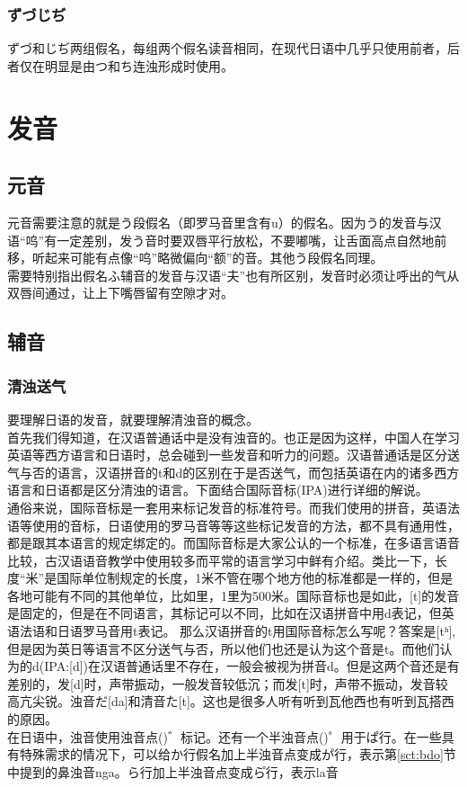 \documentclass[12pt, a4paper, oneside]{book}
\newcommand{\jp}{\CJKfamily{zj}}
\begin{document}
\subsection{ずづじぢ}
ずづ和じぢ两组假名，每组两个假名读音相同，在现代日语中几乎只使用前者，后者仅在明显是由つ和ち连浊形成时使用。

\chapter{发音}\label{chap:prn}
\section{元音}
元音需要注意的就是う段假名（即罗马音里含有u）的假名。因为う的发音与汉语“呜”有一定差别，发う音时要双唇平行放松，不要嘟嘴，让舌面高点自然地前移，听起来可能有点像“呜”略微偏向“额”的音。其他う段假名同理。\\
需要特别指出假名ふ辅音的发音与汉语“夫”也有所区别，发音时必须让呼出的气从双唇间通过，让上下嘴唇留有空隙才对。
\section{辅音}
\subsection{清浊送气}
要理解日语的发音，就要理解清浊音的概念。\\首先我们得知道，在汉语普通话中是没有浊音的。也正是因为这样，中国人在学习英语等西方语言和日语时，总会碰到一些发音和听力的问题。汉语普通话是区分送气与否的语言，汉语拼音的t和d的区别在于是否送气，而包括英语在内的诸多西方语言和日语都是区分清浊的语言。下面结合国际音标(IPA)进行详细的解说。
\\通俗来说，国际音标是一套用来标记发音的标准符号。而我们使用的拼音，英语法语等使用的音标，日语使用的罗马音等等这些标记发音的方法，都不具有通用性，都是跟其本语言的规定绑定的。而国际音标是大家公认的一个标准，在多语言语音比较，古汉语语音教学中使用较多而平常的语言学习中鲜有介绍。类比一下，长度“米”是国际单位制规定的长度，1米不管在哪个地方他的标准都是一样的，但是各地可能有不同的其他单位，比如里，1里为500米。国际音标也是如此，[t]的发音是固定的，但是在不同语言，其标记可以不同，比如在汉语拼音中用d表记，但英语法语和日语罗马音用t表记。
那么汉语拼音的t用国际音标怎么写呢？答案是[tʰ],但是因为英日等语言不区分送气与否，所以他们也还是认为这个音是t。而他们认为的d(IPA:[d])在汉语普通话里不存在，一般会被视为拼音d。但是这两个音还是有差别的，发[d]时，声带振动，一般发音较低沉；而发[t]时，声带不振动，发音较高亢尖锐。浊音だ[da]和清音た[t]。这也是很多人听{\jp {}}有听到瓦他西也有听到瓦搭西的原因。\\
在日语中，浊音使用浊音点({\jp {}})゛标记。还有一个半浊音点({\jp {}})゜用于ぱ行。在一些具有特殊需求的情况下，可以给か行假名加上半浊音点变成か゚行，表示第\ref{sct:bdo}节中提到的鼻浊音nga。ら行加上半浊音点变成ら゚行，表示la音
\end{document}
